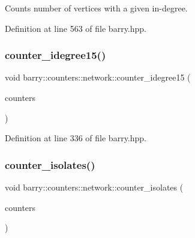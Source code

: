Counts number of vertices with a given in-\/degree. 



Definition at line 563 of file barry.\+hpp.

\mbox{\label{namespacebarry_1_1counters_1_1network_a148e6fbb549eea53ff6d744b0f683ed6}} 
\subsubsection{\texorpdfstring{counter\+\_\+idegree15()}{counter\_idegree15()}}
{\footnotesize\ttfamily void barry\+::counters\+::network\+::counter\+\_\+idegree15 (\begin{DoxyParamCaption}\item[{\hyperlink{namespacebarry_1_1counters_1_1network_a3b3c590303d47840d1967372ae495d95}{Net\+Counter\+Vector} $\ast$}]{counters }\end{DoxyParamCaption})\hspace{0.3cm}{\ttfamily [inline]}}



Definition at line 336 of file barry.\+hpp.

\mbox{\label{namespacebarry_1_1counters_1_1network_a16449353394312feed59aa5444d17dad}} 
\subsubsection{\texorpdfstring{counter\+\_\+isolates()}{counter\_isolates()}}
{\footnotesize\ttfamily void barry\+::counters\+::network\+::counter\+\_\+isolates (\begin{DoxyParamCaption}\item[{\hyperlink{namespacebarry_1_1counters_1_1network_a3b3c590303d47840d1967372ae495d95}{Net\+Counter\+Vector} $\ast$}]{counters }\end{DoxyParamCaption})\hspace{0.3cm}{\ttfamily [inline]}}



